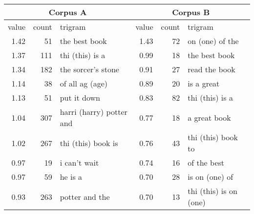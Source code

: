\documentclass[japanese]{jnlp_1.3d}
\begin{document}
\begin{table}[t]
	\label{tab:feature_trib}
	  \begin{center}
  \begin{tabular}{|r|r|l|r|r|l|} \hline
 \multicolumn{3}{|c|}{Corpus A} &  \multicolumn{3}{|c|}{Corpus B} \\ \hline  
value & count & trigram & value & count & trigram \\ \hline
1.42 & 51 & the best book & 1.43 & 72 & on (one) of the \\ 
1.37 & 111 & thi (this) is a & 0.99 & 18 & the best book \\
1.34 & 182 & the sorcer's stone & 0.91 & 27 & read the book \\
1.14 & 38 & of all ag (age)& 0.89 & 20 & is a great \\
1.13 & 51 & put it down & 0.83 & 82 & thi (this) is a \\
1.04 & 307 & harri (harry) potter and & 0.77 & 18 & a great book \\
1.02 & 267 & thi (this) book is & 0.76 & 43 & thi (this) book to \\
0.97 & 19 & i can't wait & 0.74 & 16 & of the best \\
0.97 & 59 & he is a & 0.70 & 28 & is on (one) of \\
0.93 & 263 & potter and the & 0.70 & 13 & thi (this) is on (one) \\
 \hline
\end{tabular}
  \end{center}
\end{table}
\end{document}
